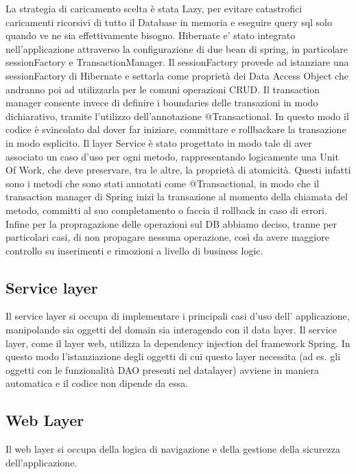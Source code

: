 La strategia di caricamento scelta è stata Lazy, per evitare
catastrofici caricamenti ricorsivi di tutto il Database in memoria e
eseguire query sql solo quando ve ne sia effettivamente bisogno.
Hibernate e' stato integrato nell'applicazione attraverso la
configurazione di due bean di spring, in particolare sessionFactory e
TransactionManager. Il sessionFactory provede ad istanziare una
sessionFactory di Hibernate e settarla come proprietà dei Data Access
Object che andranno poi ad utilizzarla per le comuni operazioni
CRUD. Il transaction manager consente invece di definire i boundaries
delle transazioni in modo dichiarativo, tramite l'utilizzo
dell'annotazione @Transactional.  In questo modo il codice è
svincolato dal dover far iniziare, committare e rollbackare la
transazione in modo esplicito. Il layer Service è stato progettato in
modo tale di aver associato un caso d'uso per ogni metodo,
rappresentando logicamente una Unit Of Work, che deve preservare, tra
le altre, la proprietà di atomicità. Questi infatti sono i metodi che
sono stati annotati come @Transactional, in modo che il transaction
manager di Spring inizi la transazione al momento della chiamata del
metodo, committi al suo completamento o faccia il rollback in caso di
errori. Infine per la propragazione delle operazioni sul DB abbiamo
deciso, tranne per particolari casi, di non propagare nessuna
operazione, così da avere maggiore controllo su inserimenti e
rimozioni a livello di business logic.


\subsection{Service layer}

Il service layer si occupa di implementare i principali casi d'uso
dell' applicazione, manipolando sia oggetti del domain sia interagendo
con il data layer. Il service layer, come il layer web, utilizza la
dependency injection del framework Spring. In questo modo
l'istanziazione degli oggetti di cui questo layer necessita (ad
es. gli oggetti con le funzionalità DAO presenti nel datalayer)
avviene in maniera automatica e il codice non dipende da essa. 

\subsection{Web Layer}

Il web layer si occupa della logica di navigazione e della
gestione della sicurezza dell'applicazione. 

